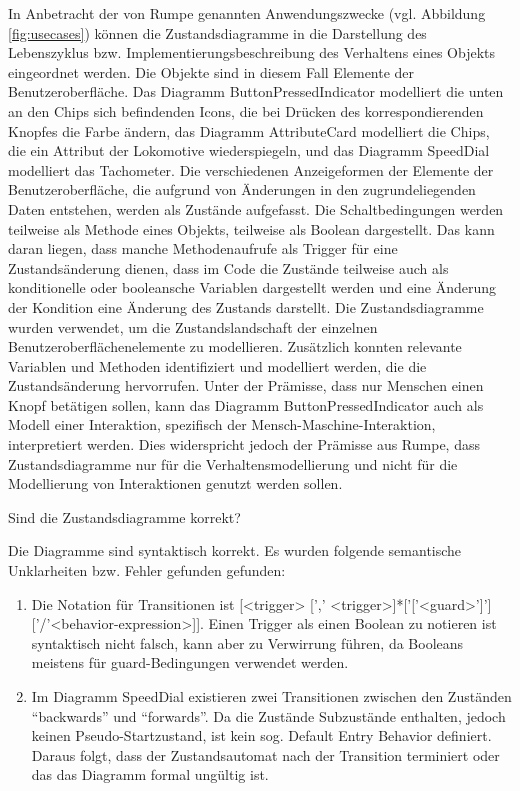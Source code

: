 \documentclass[first=Christoph,last=Hoentzsch,company=Softwareprojekt,location=Dresden,simple, noheader]{baarticle}
\begin{document}
\begin{basimple}
    In Anbetracht der von Rumpe genannten Anwendungszwecke (vgl. Abbildung \ref{fig:usecases}) können die Zustandsdiagramme in die Darstellung des Lebenszyklus bzw. Implementierungsbeschreibung des Verhaltens eines Objekts eingeordnet werden. 
    Die Objekte sind in diesem Fall Elemente der Benutzeroberfläche.
    Das Diagramm ButtonPressedIndicator modelliert die unten an den Chips sich befindenden Icons, die bei Drücken des korrespondierenden Knopfes die Farbe ändern, das Diagramm AttributeCard modelliert die Chips, die ein Attribut der Lokomotive wiederspiegeln, und das Diagramm SpeedDial modelliert das Tachometer.
    Die verschiedenen Anzeigeformen der Elemente der Benutzeroberfläche, die aufgrund von Änderungen in den zugrundeliegenden Daten entstehen, werden als Zustände aufgefasst.
    Die Schaltbedingungen werden teilweise als Methode eines Objekts, teilweise als Boolean dargestellt. 
    Das kann daran liegen, dass manche Methodenaufrufe als Trigger für eine Zustandsänderung dienen, dass im Code die Zustände teilweise auch als konditionelle oder booleansche Variablen dargestellt werden und eine Änderung der Kondition eine Änderung des Zustands darstellt.
    Die Zustandsdiagramme wurden verwendet, um die Zustandslandschaft der einzelnen Benutzeroberflächenelemente zu modellieren.
    Zusätzlich konnten relevante Variablen und Methoden identifiziert und modelliert werden, die die Zustandsänderung hervorrufen.
    Unter der Prämisse, dass nur Menschen einen Knopf betätigen sollen, kann das Diagramm ButtonPressedIndicator auch als Modell einer Interaktion, spezifisch der Mensch-Maschine-Interaktion, interpretiert werden.
    Dies widerspricht jedoch der Prämisse aus Rumpe, dass Zustandsdiagramme nur für die Verhaltensmodellierung und nicht für die Modellierung von Interaktionen genutzt werden sollen.

    Sind die Zustandsdiagramme korrekt?
    
    Die Diagramme sind syntaktisch korrekt.
    Es wurden folgende semantische Unklarheiten bzw. Fehler gefunden gefunden:
    \begin{enumerate}
        \item Die Notation für Transitionen ist [<trigger> [',' <trigger>]*['['<guard>']']['/'<behavior-expression>]].
        Einen Trigger als einen Boolean zu notieren ist syntaktisch nicht falsch, kann aber zu Verwirrung führen, da Booleans meistens für guard-Bedingungen verwendet werden.
        \item Im Diagramm SpeedDial existieren zwei Transitionen zwischen den Zuständen \enquote{backwards} und \enquote{forwards}. 
        Da die Zustände Subzustände enthalten, jedoch keinen Pseudo-Startzustand, ist kein sog. Default Entry Behavior definiert. 
        Daraus folgt, dass der Zustandsautomat nach der Transition terminiert oder das das Diagramm formal ungültig ist. 
    \end{enumerate}
    

\end{basimple}
\end{document}
